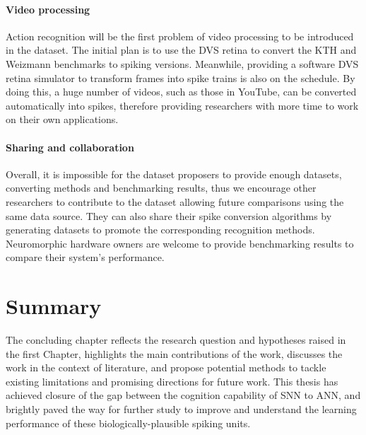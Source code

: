 \paragraph{Video processing}
Action recognition will be the first problem of video processing to be introduced in the dataset.
The initial plan is to use the DVS retina to convert the KTH and Weizmann benchmarks to spiking versions.
Meanwhile, providing a software DVS retina simulator to transform frames into spike trains is also on the schedule.
By doing this, a huge number of videos, such as those in YouTube, can be converted automatically into spikes, therefore providing researchers with more time to work on their own applications.

\paragraph{Sharing and collaboration}
Overall, it is impossible for the dataset proposers to provide enough datasets, converting methods and benchmarking results, thus we encourage other researchers to contribute to the dataset allowing future comparisons using the same data source.
They can also share their spike conversion algorithms by generating datasets to promote the corresponding recognition methods.
Neuromorphic hardware owners are welcome to provide benchmarking results to compare their system's performance.
\section{Summary}

The concluding chapter reflects the research question and hypotheses raised in the first Chapter, highlights the main contributions of the work, discusses the work in the context of literature, and propose potential methods to tackle existing limitations and promising directions for future work.
This thesis has achieved closure of the gap between the cognition capability of SNN to ANN, and brightly paved the way for further study to improve and understand the learning performance of these biologically-plausible spiking units.